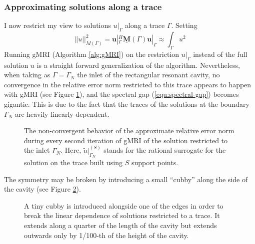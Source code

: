 \documentclass[11pt, a4paper]{article}
\begin{document}
\subsubsection{Approximating solutions along a trace}
\label{subsubsec:traces}

I now restrict my view to solutions $u|_{\Gamma}$ along a trace $\Gamma$. Setting
\begin{equation}
    ||u||_{M(\Gamma)}^2 = \mathbf{u}|_{\Gamma}^H \mathbf{\underline{M}}(\Gamma) \mathbf{u}|_{\Gamma}
        \approx \int_{\Gamma} u^2
\end{equation}
Running \acrshort{gMRI} (Algorithm \ref{alg:gMRI}) on the restriction $u|_{\Gamma}$
instead of the full solution $u$ is a straight forward generalization of the
algorithm. Nevertheless, when taking as $\Gamma = \Gamma_N$ the inlet of the
rectangular resonant cavity, no convergence in the relative error norm restricted
to this trace appears to happen with \acrshort{gMRI} (see Figure \ref{fig:rectangular-cavity-trace-errornorm}),
and the spectral gap (\ref{equ:spectral-gap}) becomes gigantic.
This is due to the fact that the traces of the solutions at the boundary $\Gamma_N$
are heavily linearly dependent.

\begin{figure}[ht]
    \centering
    
    \caption{The non-convergent behavior of the approximate relative error norm
    during every second iteration of \acrshort{gMRI} of the solution
    restricted to the inlet $\Gamma_N$. Here, $\tilde{u}|_{\Gamma_N}^{(S)}$ stands 
    for the rational surrogate for the solution on the trace built using $S$
    support points.}
    \label{fig:rectangular-cavity-trace-errornorm}
\end{figure}

The symmetry may be broken by introducing a small \enquote{cubby} along the side
of the cavity (see Figure \ref{fig:rectangular-cavity-cubby}). 

\begin{figure}[h]
    \centering
    
    \caption{A tiny cubby is introduced alongside one of the edges in order to
    break the linear dependence of solutions restricted to a trace. It extends
    along a quarter of the length of the cavity but extends outwards only by
    1/100-th of the height of the cavity.}
    \label{fig:rectangular-cavity-cubby}
\end{figure}
\end{document}
